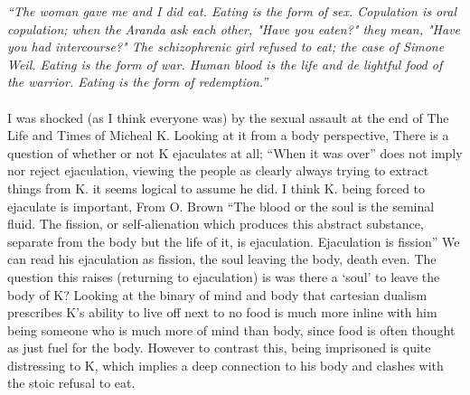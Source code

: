 
\textit{``The woman gave me and I did eat. Eating is the form of sex. Copulation is oral copulation; when the Aranda ask each other, "Have you eaten?" they mean, "Have you had intercourse?" The schizophrenic girl refused to eat; the case of Simone Weil. Eating is the form of war. Human blood is the life and de lightful food of the warrior. Eating is the form of redemption.''}
\paragraph{}

I was shocked (as I think everyone was) by the sexual assault at the end of The Life and Times of Micheal K. Looking at it from a body perspective, There is a question of whether or not K ejaculates at all; ``When it was over'' does not imply nor reject ejaculation, viewing the people as clearly always trying to extract things from K. it seems logical to assume he did.  I think K. being forced to ejaculate is important, From O. Brown ``The blood or the soul is the seminal fluid. The fission, or self-alienation which produces this abstract substance, separate from the body but the life of it, is ejaculation. Ejaculation is fission'' We can read his ejaculation as fission, the soul leaving the body, death even. The question this raises (returning to ejaculation) is was there a `soul' to leave the body of K? Looking at the binary of mind and body that cartesian dualism prescribes K's ability to live off next to no food is much more inline with him being someone who is much more of mind than body, since food is often thought as just fuel for the body. However to contrast this, being imprisoned is quite distressing to K, which implies a deep connection to his body and clashes with the stoic refusal to eat.



